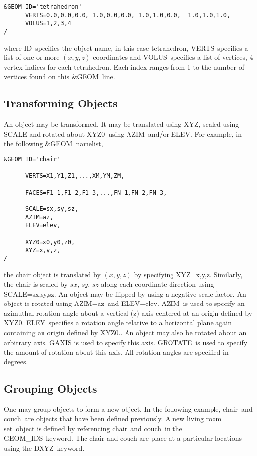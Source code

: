 \documentclass[12pt]{article}
\begin{document}
\begin{verbatim}
&GEOM ID='tetrahedron'
      VERTS=0.0,0.0,0.0, 1.0,0.0,0.0, 1.0,1.0,0.0,  1.0,1.0,1.0,
      VOLUS=1,2,3,4
/
\end{verbatim}

\noindent where {\ct ID}\ specifies the object name, in this case {\ct tetrahedron},
{\ct VERTS}\ specifies a list of one or more $(x,y,z)$ coordinates and {\ct VOLUS}\ specifies a list of vertices, 4 vertex indices for each
tetrahedron. Each index ranges from 1 to the number of vertices found on this {\ct \&GEOM}\ line.


\subsection{Transforming Objects}
An object may be transformed.
It  may be translated using {\ct XYZ}, scaled using {\ct SCALE} and rotated about {\ct XYZ0}\ using {\ct AZIM}\ and/or {\ct ELEV}.
For example, in the following {\ct \&GEOM}\ namelist,

{\small
\begin{verbatim}
&GEOM ID='chair'

      VERTS=X1,Y1,Z1,...,XM,YM,ZM,

      FACES=F1_1,F1_2,F1_3,...,FN_1,FN_2,FN_3,

      SCALE=sx,sy,sz,
      AZIM=az,
      ELEV=elev,

      XYZ0=x0,y0,z0,
      XYZ=x,y,z,
/
\end{verbatim}
}

\noindent the chair object is translated by $(x,y,z)$ by specifying {\ct XYZ=x,y,z}.
Similarly, the chair is scaled by $sx$, $sy$, $sz$ along each coordinate direction using {\ct SCALE=sx,sy,sz}.
An object may be flipped by using a negative scale factor.
An object is rotated using {\ct AZIM=az}\ and {\ct ELEV=elev}.
{\ct AZIM}\ is used to specify an azimuthal rotation angle about a vertical (z) axis centered at an origin defined by {\ct XYZ0}.
{\ct ELEV}\ specifies a rotation angle relative to a horizontal plane again containing an origin defined by {\ct XYZ0}..
An object may also be rotated about an arbitrary axis.
{\ct GAXIS} is used to specify this axis.
{\ct GROTATE}\ is used to specify the amount of rotation about this axis.
All rotation angles are specified in degrees.

\subsection{Grouping Objects}
One may group objects to form a new object.  In the following example,
{\ct chair}\ and {\ct couch}\ are objects that have been defined previously.  A new {\ct living room set}\ object
is defined by referencing {\ct chair}\ and {\ct couch}\ in the {\ct GEOM\_IDS}\ keyword.  The chair and couch
are place at a particular locations using the {\ct DXYZ}\ keyword.
\end{document}
